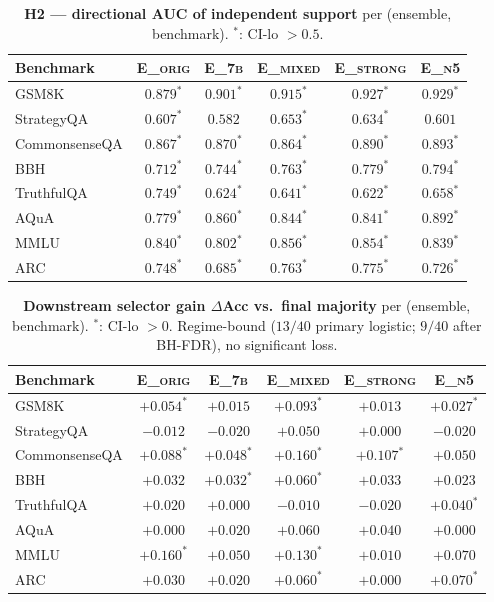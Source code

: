 \begin{table}[h]
\centering\small
\caption{\textbf{H2 --- directional AUC of independent support} per (ensemble, benchmark). $^{*}$: CI-lo $>0.5$.}
\label{tab:grid_h2}
\begin{tabular}{lccccc}
\toprule
Benchmark & \textsc{E\_orig} & \textsc{E\_7b} & \textsc{E\_mixed} & \textsc{E\_strong} & \textsc{E\_n5} \\
\midrule
GSM8K         & $0.879^{*}$ & $0.901^{*}$ & $0.915^{*}$ & $0.927^{*}$ & $0.929^{*}$ \\
StrategyQA    & $0.607^{*}$ & $0.582$ & $0.653^{*}$ & $0.634^{*}$ & $0.601$ \\
CommonsenseQA & $0.867^{*}$ & $0.870^{*}$ & $0.864^{*}$ & $0.890^{*}$ & $0.893^{*}$ \\
BBH           & $0.712^{*}$ & $0.744^{*}$ & $0.763^{*}$ & $0.779^{*}$ & $0.794^{*}$ \\
TruthfulQA    & $0.749^{*}$ & $0.624^{*}$ & $0.641^{*}$ & $0.622^{*}$ & $0.658^{*}$ \\
AQuA          & $0.779^{*}$ & $0.860^{*}$ & $0.844^{*}$ & $0.841^{*}$ & $0.892^{*}$ \\
MMLU          & $0.840^{*}$ & $0.802^{*}$ & $0.856^{*}$ & $0.854^{*}$ & $0.839^{*}$ \\
ARC           & $0.748^{*}$ & $0.685^{*}$ & $0.763^{*}$ & $0.775^{*}$ & $0.726^{*}$ \\
\bottomrule
\end{tabular}
\end{table}

\begin{table}[h]
\centering\small
\caption{\textbf{Downstream selector gain $\Delta$Acc vs.\ final majority} per (ensemble, benchmark).
$^{*}$: CI-lo $>0$. Regime-bound ($13/40$ primary logistic; $9/40$ after BH-FDR), no significant loss.}
\label{tab:grid_sel}
\begin{tabular}{lccccc}
\toprule
Benchmark & \textsc{E\_orig} & \textsc{E\_7b} & \textsc{E\_mixed} & \textsc{E\_strong} & \textsc{E\_n5} \\
\midrule
GSM8K         & $+0.054^{*}$ & $+0.015$ & $+0.093^{*}$ & $+0.013$ & $+0.027^{*}$ \\
StrategyQA    & $-0.012$ & $-0.020$ & $+0.050$ & $+0.000$ & $-0.020$ \\
CommonsenseQA & $+0.088^{*}$ & $+0.048^{*}$ & $+0.160^{*}$ & $+0.107^{*}$ & $+0.050$ \\
BBH           & $+0.032$ & $+0.032^{*}$ & $+0.060^{*}$ & $+0.033$ & $+0.023$ \\
TruthfulQA    & $+0.020$ & $+0.000$ & $-0.010$ & $-0.020$ & $+0.040^{*}$ \\
AQuA          & $+0.000$ & $+0.020$ & $+0.060$ & $+0.040$ & $+0.000$ \\
MMLU          & $+0.160^{*}$ & $+0.050$ & $+0.130^{*}$ & $+0.010$ & $+0.070$ \\
ARC           & $+0.030$ & $+0.020$ & $+0.060^{*}$ & $+0.000$ & $+0.070^{*}$ \\
\bottomrule
\end{tabular}
\end{table}

